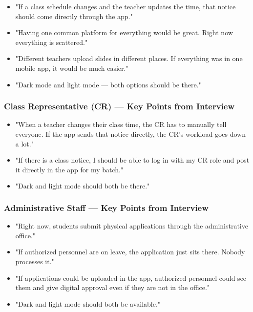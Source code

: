 \documentclass[12pt,a4paper]{article}
\begin{document}
\begin{tcolorbox}[quotebox]
\begin{itemize}[leftmargin=*, label=\textbullet, itemsep=4pt]
  \item "If a class schedule changes and the teacher updates the time, that notice should come directly through the app."
  \item "Having one common platform for everything would be great. Right now everything is scattered."
  \item "Different teachers upload slides in different places. If everything was in one mobile app, it would be much easier."
  \item "Dark mode and light mode --- both options should be there."
\end{itemize}
\end{tcolorbox}

\subsubsection{Class Representative (CR) --- Key Points from Interview}

\begin{tcolorbox}[quotebox]
\begin{itemize}[leftmargin=*, label=\textbullet, itemsep=4pt]
  \item "When a teacher changes their class time, the CR has to manually tell everyone. If the app sends that notice directly, the CR's workload goes down a lot."
  \item "If there is a class notice, I should be able to log in with my CR role and post it directly in the app for my batch."
  \item "Dark and light mode should both be there."
\end{itemize}
\end{tcolorbox}

\subsubsection{Administrative Staff --- Key Points from Interview}

\begin{tcolorbox}[quotebox]
\begin{itemize}[leftmargin=*, label=\textbullet, itemsep=4pt]
  \item "Right now, students submit physical applications through the administrative office."
  \item "If authorized personnel are on leave, the application just sits there. Nobody processes it."
  \item "If applications could be uploaded in the app, authorized personnel could see them and give digital approval even if they are not in the office."
  \item "Dark and light mode should both be available."
\end{itemize}
\end{tcolorbox}
\end{document}

